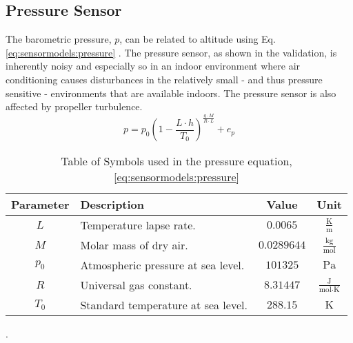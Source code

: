     \subsection{Pressure Sensor}
        The barometric pressure, $p$, can be related to altitude using Eq. \eqref{eq:sensormodels:pressure} \cite{physicshandbook}.
        The pressure sensor, as shown in the validation, is inherently
        noisy and especially so in an indoor environment where air conditioning
        causes disturbances in the relatively small - and thus pressure sensitive -
        environments that are available indoors.
        The pressure sensor is also affected by propeller turbulence.
        \begin{equation}
            \label{eq:sensormodels:pressure}
            p = p_{0} \left( 1 - \frac{L \cdot h}{T_{0}} \right)^{\frac{g \cdot M}{R\cdot L}} + e_{p}
        \end{equation}
        \begin{table}
            \begin{tabularx}{\tablewidth}{|c|X|c|c|}\hline
                \textbf{Parameter} & \textbf{Description} & \textbf{Value} & \textbf{Unit} \\\hline
                $L$       & Temperature lapse rate.            & $0.0065$ & $\frac{\text{K}}{\text{m}}$ \\\hline
                $M$       & Molar mass of dry air.             & $0.0289644$ & $\frac{\text{kg}}{\text{mol}}$ \\\hline
                $p_{0}$   & Atmospheric pressure at sea level. & $101325$ & $\text{Pa}$ \\\hline
                $R$       & Universal gas constant.            & $8.31447$ & $\frac{\text{J}}{\text{mol} \cdot \text{K}}$ \\\hline
                $T_{0}$   & Standard temperature at sea level. & $288.15$ & $\text{K}$ \\\hline
            \end{tabularx}
            \label{tos:pressuresensor}
            \caption{Table of Symbols used in the pressure equation, \eqref{eq:sensormodels:pressure}}.
        \end{table}

    
